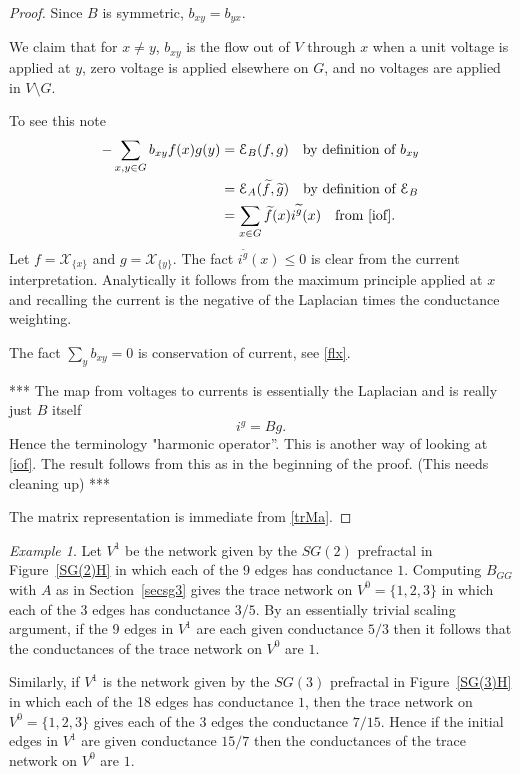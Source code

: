 \documentclass[a4paper]{amsart}
\theoremstyle{plain}
\theoremstyle{definition}
\theoremstyle{remark}
\newtheorem{example}[theorem]{Example}
\begin{document}
\begin{proof}  Since $ B $ is symmetric, $ b_{xy} = b_{yx} $. 

We claim that for $ x \neq y $, $ b_{xy} $ is the flow out of $ V $ through $ x $ when a unit voltage is applied at $ y $, zero voltage is applied elsewhere on $ G$, and no voltages are applied in $ V\setminus G $.  

To see this note  
\begin{align*}
 -\sum_{x,y\in G} b_{xy} f(x) g(y) &= \mathcal{E}_B(f,g) \quad \text{by definition of $ b_{xy} $}\\
    &= \mathcal{E}_A(\widetilde{f}, \widetilde{g}) \quad \text{by definition of $ \mathcal{E}_B $} \\ 
    &= \sum_{x\in G} \widetilde{f}(x) i^{\widetilde{g}}(x) \quad \text{from \eqref{iof}}.
    \end{align*} 
Let $ f = \mathcal{X}_{\{x\}} $ and $ g = \mathcal{X}_{\{y\}} $.  
The fact $  i^{\widetilde{g}}(x) \leq 0 $ is clear from the current interpretation.  Analytically it follows  from the maximum principle applied at $ x $ and recalling the current is the negative of the Laplacian times the conductance weighting. 

The fact $ \sum_y{b_{xy}} = 0 $ is conservation of current, see \eqref{flx}. 

\medskip
*** The map from voltages to currents is essentially the Laplacian and is really just $ B $ itself  
\[ i^g = B g. \]
 Hence the terminology "harmonic operator''.  This is another way of looking at \eqref{iof}.  The result follows from this as in the beginning of the proof.  (This needs cleaning up) ***

\medskip The matrix representation is immediate from \eqref{trMa}.
\end{proof} 


\begin{example}  \label{extn}  Let $ V^{1} $ be the network  given by the $ SG(2) $ prefractal in Figure~\ref{SG(2)H}  in which each of the 9 edges has conductance $ 1 $.  Computing $ B_{GG} $ with $ A $ as in Section~\ref{secsg3}  gives the trace network on $V^{0} =  \{1,2,3\} $  in which each of the 3 edges has conductance $ 3/5$.  By   an essentially trivial scaling argument,  if  the 9 edges in $ V^{1} $ are each given conductance $ 5/3 $ then it follows that the conductances of the trace network on $  V^{0}  $ are $ 1 $.

Similarly, if $ V^{1} $ is the network  given by the $ SG(3) $ prefractal in Figure~\ref{SG(3)H}  in which each   of the 18 edges  has conductance $ 1 $,  then  the trace network on $V^{0} =  \{1,2,3\} $  gives each of the 3 edges the conductance $ 7/15$.  Hence if  the initial edges in $ V^{1} $ are given conductance $ 15/7 $ then the conductances of the trace network on $  V^{0}  $ are $ 1 $.
\end{example} 
\end{document}
